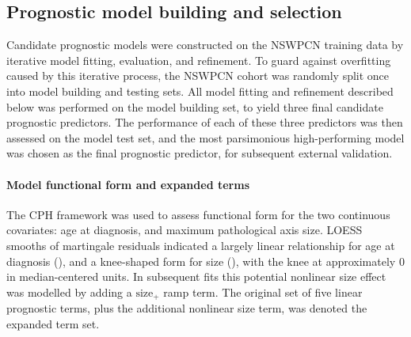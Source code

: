 \documentclass[dissertation.tex]{subfiles}
\begin{document}
\subsection{Prognostic model building and selection}
Candidate prognostic models were constructed on the \gls{NSWPCN} training data by iterative model fitting, evaluation, and refinement.  To guard against overfitting caused by this iterative process, the \gls{NSWPCN} cohort was randomly split once into model building and testing sets.  All model fitting and refinement described below was performed on the model building set, to yield three final candidate prognostic predictors.  The performance of each of these three predictors was then assessed on the model test set, and the most parsimonious high-performing model was chosen as the final prognostic predictor, for subsequent external validation.

\paragraph{Model functional form and expanded terms}
The \gls{CPH} framework was used to assess functional form for the two continuous covariates: age at diagnosis, and maximum pathological axis size.  \gls{LOESS} smooths of martingale residuals \cite{Therneau1990} indicated a largely linear relationship for age at diagnosis (), and a knee-shaped form for size (), with the knee at approximately $0$ in median-centered units.  In subsequent fits this potential nonlinear size effect was modelled by adding a $\mbox{size}_+$ ramp term.  The original set of five linear prognostic terms, plus the additional nonlinear size term, was denoted the expanded term set.
\end{document}

